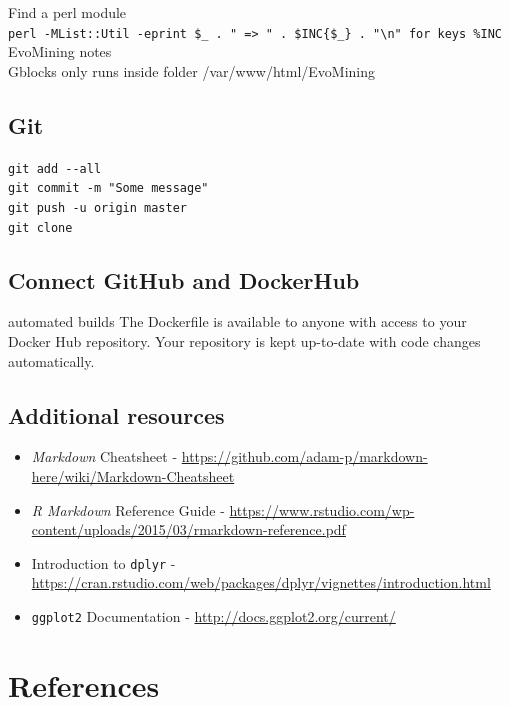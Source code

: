\documentclass[12pt,twoside]{reedthesis}
\begin{document}
  Find a perl module\\
  \texttt{perl\ -MList::Util\ -e\textquotesingle{}print\ \$\_\ .\ "\ =\textgreater{}\ "\ .\ \$INC\{\$\_\}\ .\ "\textbackslash{}n"\ for\ keys\ \%INC\textquotesingle{}}
  EvoMining notes\\
  Gblocks only runs inside folder /var/www/html/EvoMining
  
  \section{Git}\label{git}
  
  \texttt{git\ add\ -\/-all}\\
  \texttt{git\ commit\ -m\ "Some\ message"}\\
  \texttt{git\ push\ -u\ origin\ master}\\
  \texttt{git\ clone}
  
  \section{Connect GitHub and
  DockerHub}\label{connect-github-and-dockerhub}
  
  automated builds The Dockerfile is available to anyone with access to
  your Docker Hub repository. Your repository is kept up-to-date with code
  changes automatically.
  
  \section{Additional resources}\label{additional-resources}
  
  \begin{itemize}
  \item
    \emph{Markdown} Cheatsheet -
    \url{https://github.com/adam-p/markdown-here/wiki/Markdown-Cheatsheet}
  \item
    \emph{R Markdown} Reference Guide -
    \url{https://www.rstudio.com/wp-content/uploads/2015/03/rmarkdown-reference.pdf}
  \item
    Introduction to \texttt{dplyr} -
    \url{https://cran.rstudio.com/web/packages/dplyr/vignettes/introduction.html}
  \item
    \texttt{ggplot2} Documentation -
    \url{http://docs.ggplot2.org/current/}
  \end{itemize}
  
  \backmatter
  
  \chapter{References}\label{references}
  
\end{document}
